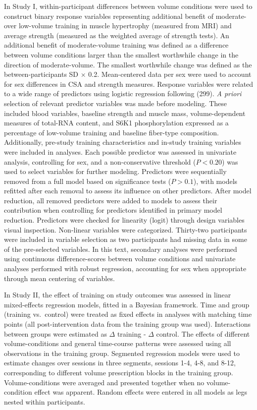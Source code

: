 \documentclass[twoside,10pt]{gihclass} %
\begin{document}
In Study I, within-participant differences between volume conditions were used to construct binary response variables representing additional benefit of moderate- over low-volume training in muscle hypertrophy (measured from MRI) and average strength (measured as the weighted average of strength tests). An additional benefit of moderate-volume training was defined as a difference between volume conditions larger than the smallest worthwhile change in the direction of moderate-volume. The smallest worthwhile change was defined as the between-participants SD \(\times\) 0.2. Mean-centered data per sex were used to account for sex differences in CSA and strength measures.
Response variables were related to a wide range of predictors using logistic regression following (299). \emph{A priori} selection of relevant predictor variables was made before modeling. These included blood variables, baseline strength and muscle mass, volume-dependent measures of total-RNA content, and S6K1 phosphorylation expressed as a percentage of low-volume training and baseline fiber-type composition. Additionally, pre-study training characteristics and in-study training variables were included in analyses.
Each possible predictor was assessed in univariate analysis, controlling for sex, and a non-conservative threshold (\(P < 0.20\)) was used to select variables for further modeling.
Predictors were sequentially removed from a full model based on significance tests (\(P > 0.1\)), with models refitted after each removal to assess its influence on other predictors. After model reduction, all removed predictors were added to models to assess their contribution when controlling for predictors identified in primary model reduction. Predictors were checked for linearity (logit) through design variables visual inspection. Non-linear variables were categorized. Thirty-two participants were included in variable selection as two participants had missing data in some of the pre-selected variables.
In this text, secondary analyses were performed using continuous difference-scores between volume conditions and univariate analyses performed with robust regression, accounting for sex when appropriate through mean centering of variables.

In Study II, the effect of training on study outcomes was assessed in linear mixed-effects regression models, fitted in a Bayesian framework.
Time and group (training vs.~control) were treated as fixed effects in analyses with matching time points (all post-intervention data from the training group was used).
Interactions between groups were estimated as \(\Delta\) training - \(\Delta\) control.
The effects of different volume-conditions and general time-course patterns were assessed using all observations in the training group.
Segmented regression models were used to estimate changes over sessions in three segments, sessions 1-4, 4-8, and 8-12, corresponding to different volume prescription blocks in the training group.
Volume-conditions were averaged and presented together when no volume-condition effect was apparent.
Random effects were entered in all models as legs nested within participants.
\end{document}

